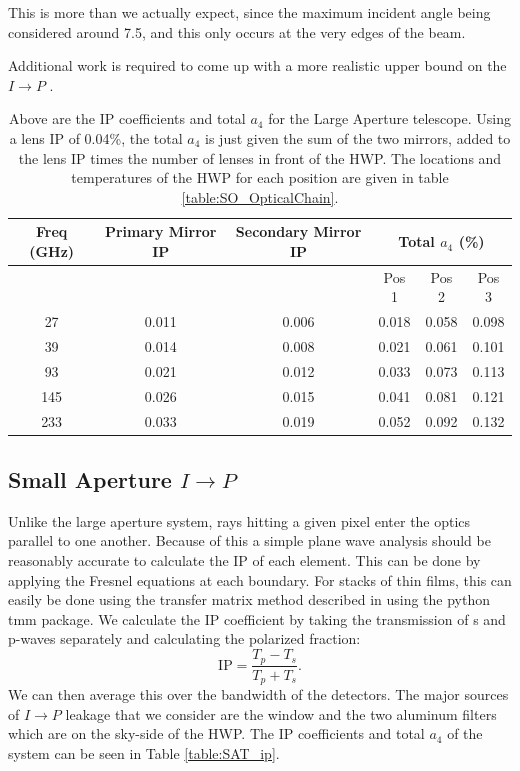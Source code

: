 \documentclass{article}
\theoremstyle{remark}
\newcommand{\tab}{\hspace*{2em}}
\newcommand{\ip}{$I\rightarrow P$ }
\begin{document}
\tab This is more than we actually expect, since the maximum incident angle being considered
around 7.5\degree, and this only occurs at the very edges of the beam.

Additional work is required to come up with a more realistic upper bound on the \ip.

\begin{table}[h]
\centering

\begin{tabular}{|c|c|c|c|c|c|}
\hline
Freq (GHz) & Primary Mirror IP & Secondary Mirror IP & \multicolumn{3}{|c|}{Total $a_4$ (\%)}  \\
\hline
 &&& Pos 1 & Pos 2 & Pos 3 \\
 \hline
27 & 0.011 & 0.006  & 0.018  & 0.058 & 0.098 \\
39 & 0.014 & 0.008  & 0.021  & 0.061 & 0.101 \\
93 & 0.021 & 0.012  & 0.033  & 0.073 & 0.113 \\
145 & 0.026 & 0.015  & 0.041  & 0.081 & 0.121 \\
233 & 0.033 & 0.019  & 0.052  & 0.092 & 0.132 \\
\hline
\end{tabular}
\caption{ Above are the IP coefficients and total $a_4$ for the Large Aperture telescope.
Using a lens IP of 0.04\%, the total $a_4$ is just given the sum of the two mirrors, added to the lens IP times the number of lenses in front of the HWP.
The locations and temperatures of the HWP for each position are given in table \ref{table:SO_OpticalChain}.
}
\label{table:LAT_ip}
\end{table}



\subsection{Small Aperture \ip}

Unlike the large aperture system, rays hitting a given pixel enter the optics parallel to one another. 
Because of this a simple plane wave analysis should be reasonably accurate to calculate the IP of each element. 
This can be done by applying the Fresnel equations at each boundary.
For stacks of thin films, this can easily be done using the transfer matrix method described in \cite{essinger-hileman_transfer_2013} using the python tmm package. 
We calculate the IP coefficient by taking the transmission of s and p-waves separately and calculating the polarized fraction:
\[\text{IP} = \frac{T_p - T_s}{T_p + T_s}.\]
We can then average this over the bandwidth of the detectors.
The major sources of \ip leakage that we consider are the window and the two aluminum filters which are on the sky-side of the HWP.
The IP coefficients and total $a_4$ of the system can be seen in Table \ref{table:SAT_ip}.
\end{document}
